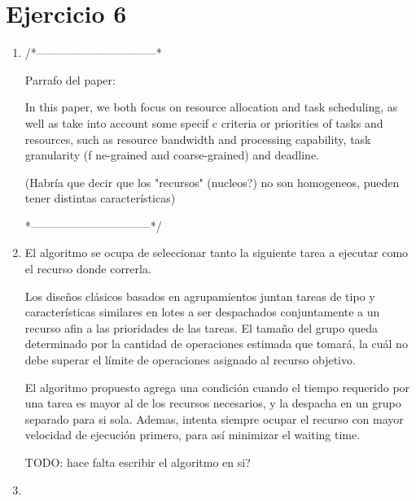 \section{Ejercicio 6}

\begin{enumerate}[label=\alph*)]

    \item


        /*--------------------------------*

        Parrafo del paper:

        In this paper, we both focus on resource allocation and task
scheduling, as well as take into account some specif
c criteria
or priorities of tasks and resources, such as resource bandwidth
and processing capability, task granularity (f
ne-grained and
coarse-grained) and deadline.

(Habría que decir que los "recursos" (nucleos?) no son homogeneos,
pueden tener distintas características)

        *--------------------------------*/

    \item El algoritmo se ocupa de seleccionar tanto
        la siguiente tarea a ejecutar como el recurso donde correrla.

        Los diseños clásicos basados en agrupamientos juntan tareas de tipo
        y características similares en lotes a ser despachados conjuntamente
        a un recurso afin a las prioridades de las tareas.
        El tamaño del grupo queda determinado por la cantidad de operaciones
        estimada que tomará, la cuál no debe superar el límite de operaciones
        asignado al recurso objetivo.

        El algoritmo propuesto agrega una condición cuando el tiempo requerido
        por una tarea es mayor al de los recursos necesarios, y la despacha
        en un grupo separado para si sola. Ademas, intenta siempre ocupar
        el recurso con mayor velocidad de ejecución primero, para así minimizar
        el waiting time.

        TODO: hace falta escribir el algoritmo en si?

    \item

\end{enumerate}

